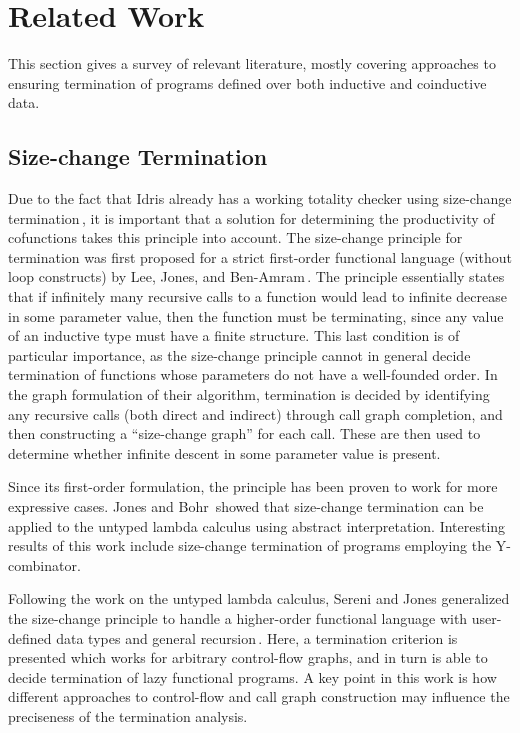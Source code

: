 \section{Related Work}
\label{sec:related_work}
This section gives a survey of relevant literature, mostly covering approaches to ensuring termination of programs defined over both inductive and coinductive data.

\subsection{Size-change Termination}
Due to the fact that Idris already has a working totality checker using size-change termination\,\citep{BradyIdrisImpl13}, it is important that a solution for determining the productivity of cofunctions takes this principle into account. The size-change principle for termination was first proposed for a strict first-order functional language (without loop constructs) by Lee, Jones, and Ben-Amram\,\citep{LeeJones01SizeChange}. The principle essentially states that if infinitely many recursive calls to a function would lead to infinite decrease in some parameter value, then the function must be terminating, since any value of an inductive type must have a finite structure. This last condition is of particular importance, as the size-change principle cannot in general decide termination of functions whose parameters do not have a well-founded order. In the graph formulation of their algorithm, termination is decided by identifying any recursive calls (both direct and indirect) through call graph completion, and then constructing a ``size-change graph'' for each call. These are then used to determine whether infinite descent in some parameter value is present.

Since its first-order formulation, the principle has been proven to work for more expressive cases. Jones and Bohr\,\citep{Jones04Untyped} showed that size-change termination can be applied to the untyped lambda calculus using abstract interpretation. Interesting results of this work include size-change termination of programs employing the Y-combinator.

Following the work on the untyped lambda calculus, Sereni and Jones generalized the size-change principle to handle a higher-order functional language with user-defined data types and general recursion\,\citep{Sereni05terminationanalysis,Sereni06Phd}. Here, a termination criterion is presented which works for arbitrary control-flow graphs, and in turn is able to decide termination of lazy functional programs. A key point in this work is how different approaches to control-flow and call graph construction may influence the preciseness of the termination analysis.

